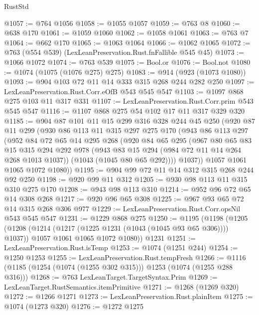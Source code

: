 \begin{lexlean}{RustStd}
\begin{coremodule}
@1057 := @764 @1056
@1058 := @1055 @1057
@1059 := @763 @8
@1060 := @638 @170
@1061 := @1059 @1060
@1062 := @1058 @1061
@1063 := @763 @7
@1064 := @662 @170
@1065 := @1063 @1064
@1066 := @1062 @1065
@1072 := @763 (@554 @539) (LexLeanPreservation.Rust.fnFallible @545 @45)
@1073 := @1066 @1072
@1074 := @763 @539
@1075 := Bool.or
@1076 := Bool.not
@1080 := @1074 (@1075 (@1076 @275) @275)
@1083 := @914 (@923 (@1073 @1080))
@1093 := @904 @103 @72 @11 @14 @333 @315 @268 @244 @282 @250
@1097 := LexLeanPreservation.Rust.Corr.eOfB @543 @545 @547
@1103 := @1097 @868 @275 @103 @11 @317 @331
@1107 := LexLeanPreservation.Rust.Corr.prim @543 @545 @547
@1116 := @1107 @868 @275 @54 @102 @17 @11 @317 @329 @320
@1185 := @904
    @87
    @101
    @11
    @15
    @299
    @316
    @328
    @244
    @45
    @250
    (@920
      @87
      @11
      @299
      (@930
        @86
        @113
        @11
        @315
        @297
        @275
        @170
        (@943
          @86
          @113
          @297
          (@952
            @84
            @72
            @65
            @14
            @295
            @268
            (@920
              @84
              @65
              @295
              (@967
                @80
                @65
                @83
                @15
                @315
                @294
                @292
                @978
                (@943 @83 @15 @294 (@984 @72 @11 @14 @264 @268 @1013 @1037))
                (@1043 (@1045 @80 @65 @292))))
            @1037))
        @1057
        @1061
        @1065
        @1072
        @1080))
@1195 := @904 @99 @72 @11 @14 @312 @315 @268 @244 @92 @250
@1198 := @920 @99 @11 @312
@1205 := @930 @98 @113 @11 @315 @310 @275 @170
@1208 := @943 @98 @113 @310
@1214 := @952 @96 @72 @65 @14 @308 @268
@1217 := @920 @96 @65 @308
@1225 := @967 @93 @65 @72 @14 @315 @268 @306 @977
@1229 := LexLeanPreservation.Rust.Corr.opsNil @543 @545 @547
@1231 := @1229 @868 @275
@1250 := @1195
    (@1198
      (@1205
        (@1208 (@1214 (@1217 (@1225 @1231 (@1043 (@1045 @93 @65 @306)))) @1037))
        @1057
        @1061
        @1065
        @1072
        @1080))
    @1231
@1251 := LexLeanPreservation.Rust.isTemp
@1253 := @1074 (@1251 @244)
@1254 := @1250 @1253
@1255 := LexLeanPreservation.Rust.tempFresh
@1266 := @1116 (@1185 (@1254 (@1074 (@1255 @302 @315))) @1253 (@1074 (@1255 @288 @316)))
@1268 := @763 LexLeanTarget.TargetSyntax.Prim
@1269 := LexLeanTarget.RustSemantics.itemPrimitive
@1271 := @1268 (@1269 @320)
@1272 := @1266 @1271
@1273 := LexLeanPreservation.Rust.plainItem
@1275 := @1074 (@1273 @320)
@1276 := @1272 @1275

\end{coremodule}
\end{lexlean}
